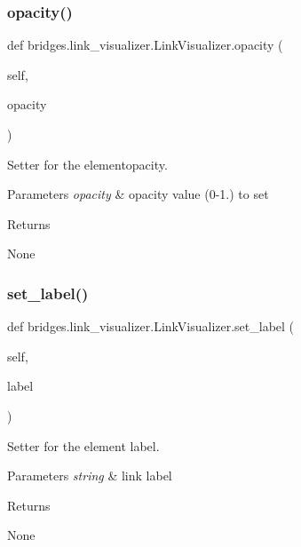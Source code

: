 \subsubsection{\texorpdfstring{opacity()}{opacity()}\hspace{0.1cm}{\footnotesize\ttfamily [2/2]}}
{\footnotesize\ttfamily def bridges.\+link\+\_\+visualizer.\+Link\+Visualizer.\+opacity (\begin{DoxyParamCaption}\item[{}]{self,  }\item[{}]{opacity }\end{DoxyParamCaption})}



Setter for the elementopacity. 


\begin{DoxyParams}{Parameters}
{\em opacity} & opacity value (0-\/1.) to set \\
\hline
\end{DoxyParams}
\begin{DoxyReturn}{Returns}


None 
\end{DoxyReturn}
\mbox{\label{classbridges_1_1link__visualizer_1_1_link_visualizer_a51cb90a9162271fa083616321ae5faee}} 
\subsubsection{\texorpdfstring{set\+\_\+label()}{set\_label()}}
{\footnotesize\ttfamily def bridges.\+link\+\_\+visualizer.\+Link\+Visualizer.\+set\+\_\+label (\begin{DoxyParamCaption}\item[{}]{self,  }\item[{}]{label }\end{DoxyParamCaption})}



Setter for the element label. 


\begin{DoxyParams}{Parameters}
{\em string} & link label \\
\hline
\end{DoxyParams}
\begin{DoxyReturn}{Returns}


None 
\end{DoxyReturn}
\mbox{\label{classbridges_1_1link__visualizer_1_1_link_visualizer_a4a89f95ecc6623ba17d2c47d7425c05b}} 
